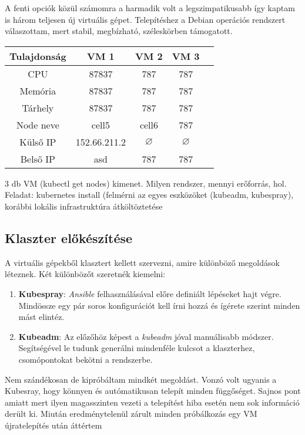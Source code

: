A fenti opciók közül számomra a harmadik volt a legszimpatikusabb így kaptam is három teljesen új virtuális gépet. Telepítéshez a Debian operációs rendszert válaszottam, mert stabil, megbízható, széleskörben támogatott.

\begin{center}
\begin{tabular}{ c||cccc| } 
\hline 
Tulajdonság & VM 1 & VM 2 & VM 3 \\
\hline \hline
CPU & 87837 & 787 & 787 \\ 
Memória & 87837 & 787 & 787 \\
Tárhely & 87837 & 787 & 787 \\  
Node neve & cell5 & cell6 & 787 \\ 
Külső IP & 152.66.211.2 & $\varnothing$ & $\varnothing$ \\ 
Belső IP & asd & 787 & 787 \\
\hline
\end{tabular}
\end{center}

3 db VM (kubectl get nodes) kimenet. Milyen rendszer, mennyi erőforrás, hol. Feladat: kubernetes install (felmérni az egyes eszközöket (kubeadm, kubespray), korábbi lokális infrastruktúra átköltöztetése  

\subsection{Klaszter előkészítése}
A virtuális gépekből klasztert kellett szervezni, amire különböző megoldások léteznek.\citep{kubernetesInstall} Két különbözőt szeretnék kiemelni:
\begin{enumerate}
  \item \textbf{Kubespray}: \textit{Ansible} felhasználásával előre definiált lépéseket hajt végre. Mindössze egy pár soros konfigurációt kell írni hozzá és ígérete szerint minden mást elintéz.
  \item \textbf{Kubeadm}: Az előzőhöz képest a \textit{kubeadm} jóval manuálisabb módszer. Segítségével le tudunk generálni mindenféle kulcsot a klaszterhez, csomópontokat bekötni a rendszerbe.
\end{enumerate}

Nem szándékosan de kipróbáltam mindkét megoldást. Vonzó volt ugyanis a Kubesray, hogy könnyen és autómatikusan telepít minden függőséget. Sajnos pont amiatt mert ilyen magasszinten vezeti a telepítést hiba esetén nem sok információ derült ki. Miután eredménytelenül zárult minden próbálkozás egy VM újratelepítés után áttértem
